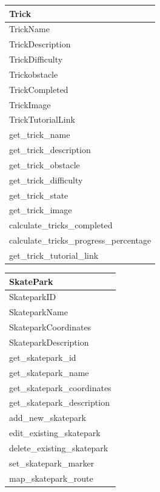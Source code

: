 \begin{center}
\begin{tabular}{|p{5cm}|}
    \hline
 \textbf{Trick} \\ \hline
TrickName\\
TrickDescription \\
TrickDifficulty \\
Trickobstacle \\
TrickCompleted \\
TrickImage \\
TrickTutorialLink \\ \hline

get\_trick\_name \\
get\_trick\_description \\
get\_trick\_obstacle \\
get\_trick\_difficulty \\
get\_trick\_state \\
get\_trick\_image \\
calculate\_tricks\_completed \\
calculate\_tricks\_progress\_percentage \\
get\_trick\_tutorial\_link\\ 
\hline 
\end{tabular}
\label{tab:Trick Class Definition}
\end{center}

\begin{center}
\begin{tabular}{|p{5cm}|}
    \hline
 \textbf{SkatePark} \\ \hline
SkateparkID \\
SkateparkName \\
SkateparkCoordinates\\
SkateparkDescription \\
 \hline 

get\_skatepark\_id \\
get\_skatepark\_name \\
get\_skatepark\_coordinates \\
get\_skatepark\_description \\ 
add\_new\_skatepark \\
edit\_existing\_skatepark \\
delete\_existing\_skatepark \\
set\_skatepark\_marker \\
map\_skatepark\_route \\

\hline

\end{tabular}
\label{tab:Skate Park Class Definition}
\end{center}

